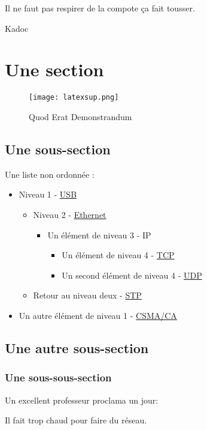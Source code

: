 \epigraph{Il ne faut pas respirer de la compote ça fait tousser.}{Kadoc}
\section{Une section}

\begin{figure}[H]
    \centering
    \texttt{[image: latexsup.png]}
    \caption{Quod Erat Demonstrandum}
\end{figure}

\FloatBarrier

\subsection{Une sous-section}

Une liste non ordonnée :
\begin{itemize}
    \item Niveau 1 - \href{https://fr.wikipedia.org/wiki/USB}{USB}
    \begin{itemize}
        \item Niveau 2 - \href{https://fr.wikipedia.org/wiki/Ethernet}{Ethernet}
        \begin{itemize}
            \item Un élément de niveau 3 - IP
            \begin{itemize}
                \item Un élément de niveau 4 - \href{https://en.wikipedia.org/wiki/TCP}{TCP}
                \item Un second élément de niveau 4 - \href{https://en.wikipedia.org/wiki/UDP}{UDP}
            \end{itemize}
        \end{itemize}
        \item Retour au niveau deux - \href{https://fr.wikipedia.org/wiki/Spanning_Tree_Protocol}{STP}
    \end{itemize}
    \item Un autre élément de niveau 1 - \href{https://fr.wikipedia.org/wiki/Carrier_Sense_Multiple_Access_with_Collision_Avoidance}{CSMA/CA}
\end{itemize}

\subsection{Une autre sous-section}
\subsubsection{Une sous-sous-section}
Un excellent professeur proclama un jour:
\begin{center}
Il fait trop chaud pour faire du réseau.
\end{center}

